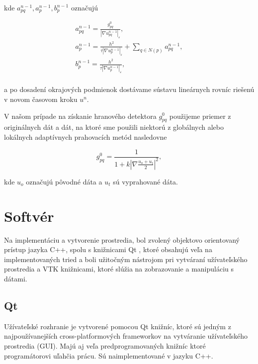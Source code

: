 \documentclass[a4paper,11pt,oneside]{article}%
\def\epsilon{\varepsilon}
\begin{document}
kde $a_{pq}^{n - 1}, a_p^{n - 1}, b_p^{n - 1}$ označujú

\begin{equation}
\begin{array}{l}
a_{pq}^{n - 1}  = \frac{g_{pq}^{0}}{|\nabla u_{pq}^{n-1}|_{\epsilon}}, \\
a_p^{n - 1} = \frac{h^2}{\tau|\nabla u_p^{n-1}|_{\epsilon}} + \sum_{q \in N(p)} a_{pq}^{n - 1}, \\
b_p^{n - 1} = \frac{h^2}{\tau|\nabla u_p^{n-1}|_{\epsilon}}, \\
\end{array}
\end{equation}

a po dosadení okrajových podmienok dostávame sústavu lineárnych rovníc riešenú v novom časovom kroku $u^n$.

V našom prípade na získanie hranového detektora $g_{pq}^{0}$ použijeme priemer z originálnych dát a dát, na ktoré sme použili niektorú z globálnych alebo lokálnych adaptívnych prahovacích metód nasledovne

\begin{equation}
g_{pq}^{0} = \frac{1}{1 + k|\nabla \frac{u_o + u_t}{2}|^2},
\end{equation}

kde $u_o$ označujú pôvodné dáta a $u_t$ sú vyprahované dáta. 

\newpage
\section{Softvér}

Na implementáciu a vytvorenie prostredia, bol zvolený objektovo orientovaný prístup jazyka C++, spolu s knižnicami Qt \cite{qt}, ktoré obsahujú veľa na implementovaných tried a boli užitočným nástrojom pri vytváraní užívateľského prostredia a VTK \cite{vtk} knižnicami, ktoré slúžia na zobrazovanie a manipuláciu s dátami. 

\subsection{Qt}
Užívateľské rozhranie je vytvorené pomocou Qt knižníc, ktoré sú jedným z najpoužívanejších cross-platformových frameworkov na vytváranie užívateľského prostredia (GUI). Majú aj veľa predprogramovaných knižníc ktoré programátorovi uľahčia prácu. Sú naimplementované v jazyku C++. 
\end{document}
